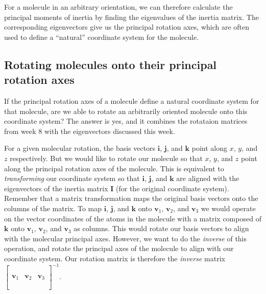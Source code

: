 \documentclass[a4paper]{article}
\newcommand{\bvec}[1]{\boldsymbol{\mathbf{#1}}}
\begin{document}
For a molecule in an arbitrary orientation, we can therefore calculate the principal moments of inertia by finding the eigenvalues of the inertia matrix. The corresponding eigenvectors give us the principal rotation axes, which are often used to define a ``natural'' coordinate system for the molecule.

\subsection{Rotating molecules onto their principal rotation axes}
If the principal rotation axes of a molecule define a natural coordinate system for that molecule, are we able to rotate an arbitrarily oriented molecule onto this coordinate system? The answer is yes, and it combines the rotataion matrices from week 8 with the eigenvectors discussed this week.

For a given molecular rotation, the basis vectors $\bvec{i}$, $\bvec{j}$, and $\bvec{k}$ point along $x$, $y$, and $z$ respectively. But we would like to rotate our molecule so that $x$, $y$, and $z$ point along the principal rotation axes of the molecule. This is equivalent to \emph{transforming} our coordinate system so that $\bvec{i}$, $\bvec{j}$, and $\bvec{k}$ are aligned with the eigenvectors of the inertia matrix $\bvec{I}$ (for the original coordinate system). Remember that a matrix transformation maps the original basis vectors onto the columns of the matrix. To map $\bvec{i}$, $\bvec{j}$, and $\bvec{k}$ onto $\bvec{v}_1$, $\bvec{v}_2$, and $\bvec{v}_3$ we would operate on the vector coordinates of the atoms in the molecule with a matrix composed of $\bvec{k}$ onto $\bvec{v}_1$, $\bvec{v}_2$, and $\bvec{v}_3$ as columns. This would rotate our basis vectors to align with the molecular principal axes. However, we want to do the \emph{inverse} of this operation, and rotate the principal axes of the molecule to align with our coordinate system. Our rotation matrix is therefore the \emph{inverse} matrix $\begin{bmatrix}\phantom{0}\\\bvec{v}_1&\bvec{v}_2&\bvec{v}_3\\\phantom{0}\end{bmatrix}^{-1}$.
\end{document}
